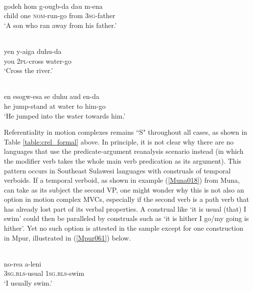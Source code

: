 \ea \label{Sougb002a}
\\
\gll godeh hom g-ougb-da dau m-ena \\
child one \textsc{nom}-run-go from \textsc{3}\textsc{sg}-father \\
\glft `A son who ran away from his father.' \\ 
\z

\ea
{}\\
\gll yen y-aiga duhu-da \\ 
you \textsc{2}\textsc{pl}-cross water-go \\
\glft `Cross the river.'\\ 
\z

\ea
{}\\
\gll en esogw-esa se duhu aud en-da \\ 
he jump-stand at water to him-go \\
\glft `He jumped into the water towards him.'\\ 
\z
\xe

Referentiality in motion complexes remains ``S" throughout all cases, as shown in Table \ref{table:crel_formal} above. In principle, it is not clear why there are no languages that use the predicate-argument reanalysis scenario instead (in which the modifier verb takes the whole main verb predication as its argument). This pattern occurs in Southeast Sulawesi languages with construals of temporal verboids. If a temporal verboid, as shown in example (\ref{Muna018}) from Muna, can take as its subject the second VP, one might wonder why this is not also an option in motion complex MVCs, especially if the second verb is a path verb that has already lost part of its verbal properties. A construal like `it is usual (that) I swim' could then be paralleled by construals such as `it is hither I go/my going is hither'. Yet no such option is attested in the sample except for one construction in Mpur, illustrated in (\ref{Mpur061}) below.

\ea \label{Muna018}
\\
\gll no-rea a-leni \\
\textsc{3}\textsc{sg}.\textsc{rls}-usual \textsc{1}\textsc{sg}.\textsc{rls}-swim \\
\glft `I usually swim.'\\ 
\z

